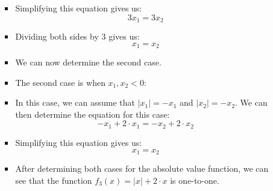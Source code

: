 \documentclass[12pt]{report}
\begin{document}
\begin{enumerate}[leftmargin=\labelsep]
\begin{enumerate}
\begin{tcolorbox}
\begin{itemize}[label={}]
\begin{equation*}
                        \end{equation*}
                        \item Simplifying this equation gives us:
                        \begin{equation*}
                            3x_1 = 3x_2
                        \end{equation*}
                        \item Dividing both sides by 3 gives us:
                        \begin{equation*}
                            x_1 = x_2
                        \end{equation*}
                        \item We can now determine the second case.
                        \item The second case is when $x_1,x_2 < 0$:
                        \item In this case, we can assume that $|x_1|=-x_1$ and $|x_2|=-x_2$. We can then determine the equation for this case:
                        \begin{equation*}
                            -x_1+2 \cdot x_1 = -x_2+2 \cdot x_2
                        \end{equation*}
                        \item Simplifying this equation gives us:
                        \begin{equation*}
                            x_1 = x_2
                        \end{equation*}
                        \item After determining both cases for the absolute value function, we can see that the function $f_3(x)=|x|+2 \cdot x$ is one-to-one.
                    \end{itemize}
                \end{tcolorbox}
        \end{enumerate}
            
\newpage


\end{enumerate}
\end{document}
